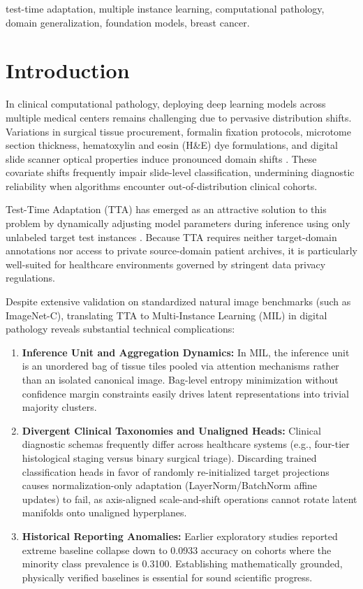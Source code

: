 \documentclass[conference]{IEEEtran}
\begin{document}
\begin{IEEEkeywords}
test-time adaptation, multiple instance learning, computational pathology, domain generalization, foundation models, breast cancer.
\end{IEEEkeywords}

\section{Introduction}

In clinical computational pathology, deploying deep learning models across multiple medical centers remains challenging due to pervasive distribution shifts. Variations in surgical tissue procurement, formalin fixation protocols, microtome section thickness, hematoxylin and eosin (H\&E) dye formulations, and digital slide scanner optical properties induce pronounced domain shifts \cite{lu2021data, chen2024uni}. These covariate shifts frequently impair slide-level classification, undermining diagnostic reliability when algorithms encounter out-of-distribution clinical cohorts.

Test-Time Adaptation (TTA) has emerged as an attractive solution to this problem by dynamically adjusting model parameters during inference using only unlabeled target test instances \cite{wang2021tent, sun2020test, niu2023towards}. Because TTA requires neither target-domain annotations nor access to private source-domain patient archives, it is particularly well-suited for healthcare environments governed by stringent data privacy regulations.

Despite extensive validation on standardized natural image benchmarks (such as ImageNet-C), translating TTA to Multi-Instance Learning (MIL) in digital pathology reveals substantial technical complications:
\begin{enumerate}
    \item \textbf{Inference Unit and Aggregation Dynamics:} In MIL, the inference unit is an unordered bag of tissue tiles pooled via attention mechanisms rather than an isolated canonical image. Bag-level entropy minimization without confidence margin constraints easily drives latent representations into trivial majority clusters.
    \item \textbf{Divergent Clinical Taxonomies and Unaligned Heads:} Clinical diagnostic schemas frequently differ across healthcare systems (e.g., four-tier histological staging versus binary surgical triage). Discarding trained classification heads in favor of randomly re-initialized target projections causes normalization-only adaptation (LayerNorm/BatchNorm affine updates) to fail, as axis-aligned scale-and-shift operations cannot rotate latent manifolds onto unaligned hyperplanes.
    \item \textbf{Historical Reporting Anomalies:} Earlier exploratory studies reported extreme baseline collapse down to 0.0933 accuracy on cohorts where the minority class prevalence is 0.3100. Establishing mathematically grounded, physically verified baselines is essential for sound scientific progress.
\end{enumerate}
\end{document}
